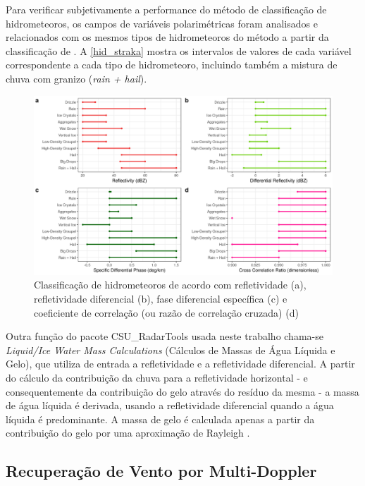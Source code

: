 Para verificar subjetivamente a performance do método de classificação de hidrometeoros, os campos de variáveis polarimétricas foram analisados e relacionados com os mesmos tipos de hidrometeoros do método a partir da classificação de . A \autoref{hid_straka} mostra os intervalos de valores de cada variável correspondente a cada tipo de hidrometeoro, incluindo também a mistura de chuva com granizo (\textit{rain + hail}).

\begin{figure}[htb]
	\begin{center}
		\caption{Classificação de hidrometeoros de acordo com refletividade (a), refletividade diferencial (b), fase diferencial específica (c) e coeficiente de correlação (ou razão de correlação cruzada) (d)} 
		\label{hid_straka}
		\includegraphics[width=\columnwidth]{../General_Processing/figures/hids_strakaetal.png}
	\end{center}
\end{figure}

Outra função do pacote CSU\_RadarTools usada neste trabalho chama-se \textit{Liquid/Ice Water Mass Calculations} (Cálculos de Massas de Água Líquida e Gelo), que utiliza de entrada a refletividade e a refletividade diferencial. A partir do cálculo da contribuição da chuva para a refletividade horizontal - e consequentemente da contribuição do gelo através do resíduo da mesma - a massa de água líquida é derivada, usando a refletividade diferencial quando a água líquida é predominante. A massa de gelo é calculada apenas a partir da contribuição do gelo por uma aproximação de Rayleigh \cite{Carey2000, Cifelli2002b}.

\subsection{Recuperação de Vento por Multi-Doppler}\label{multidoppler}

